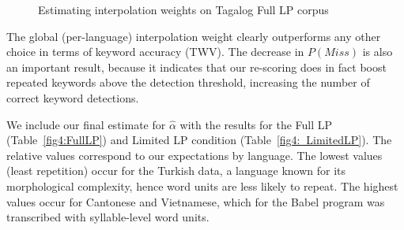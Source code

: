\begin{figure}[t]
\caption[Estimating interpolation weights]{Estimating interpolation weights on Tagalog Full LP corpus\label{fig:tagalogInterp}}
\end{figure}

The global (per-language) interpolation weight clearly outperforms any other choice in terms of keyword accuracy (TWV).   The decrease in $P(Miss)$ is also an important result, because it indicates that our re-scoring does in fact boost repeated keywords above the detection threshold, increasing the number of correct keyword detections.  

We include our final estimate for $\widehat{\alpha}$ with the results for the Full LP (Table~\ref{fig4:FullLP}) and Limited LP condition (Table~\ref{fig4:LimitedLP}).  The relative values correspond to our expectations by language.  The lowest values (least repetition) occur for the Turkish data, a language known for its morphological complexity, hence word units are less likely to repeat.  The highest values occur for Cantonese and Vietnamese, which for the Babel program was transcribed with syllable-level word units.

